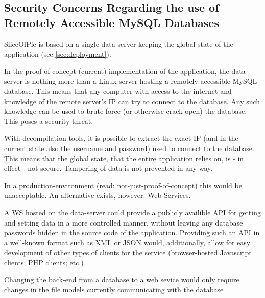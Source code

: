 \subsection{Security Concerns Regarding the use of Remotely Accessible MySQL Databases}
\label{sec:mysqlvswebservice}

SliceOfPie is based on a single data-server keeping the global state of the application (see \ref{sec:deployment}).

In the proof-of-concept (current) implementation of the application, the data-server is nothing more than a Linux-server
hosting a remotely accessible MySQL database. This means that any computer with access to the internet and knowledge of
the remote server's IP can try to connect to the database. Any such knowledge can be used to brute-force (or otherwise
crack open) the database. This poses a security threat.

With decompilation tools, it is possible to extract the exact IP (and in the current state also the username and password)
used to connect to the database. This means that the global state, that the entire application relies on, is - in effect -
not secure. Tampering of data is not prevented in any way.

In a production-environment (read: not-just-proof-of-concept) this would be unacceptable. An alternative exists, however:
Web-Services.

A WS hosted on the data-server could provide a publicly availible API for getting and setting data in a more controlled manner,
without leaving any database passwords hidden in the source code of the application. Providing such an API in a well-known format
such as XML or JSON\cite{ibmREST} would, additionally, allow for easy development of other types of clients for the service (browser-hosted
Javascript clients; PHP clients; etc.)

Changing the back-end from a database to a web sevice would only require changes in the file models currently communicating
with the database